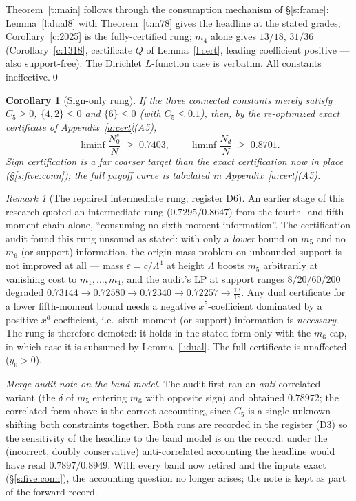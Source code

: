 \documentclass[11pt]{article}
\numberwithin{equation}{section}
\newtheorem{corollary}[theorem]{Corollary}
\theoremstyle{definition}
\theoremstyle{remark}
\newtheorem{remark}[theorem]{Remark}
\begin{document}
Theorem~\ref{t:main} follows through the consumption mechanism
of \S\ref{s:frame}: Lemma~\ref{l:dual8} with
Theorem~\ref{t:m78} gives the headline at the stated grades;
Corollary~\ref{c:2025} is the fully-certified rung; $m_4$
alone gives $13/18$, $31/36$
(Corollary~\ref{c:1318}, certificate $Q$ of Lemma~\ref{l:cert},
leading coefficient positive --- also support-free). The
Dirichlet $L$-function case is verbatim. All constants
ineffective.\qed

\begin{corollary}[Sign-only rung]\label{c:signs}
If the three connected constants merely satisfy $C_5\ge0$,
$\{4,2\}\le0$ and $\{6\}\le0$ (with $C_5\le0.1$), then, by the
re-optimized exact certificate of Appendix~\ref{a:cert}(A5),
\[
\liminf\frac{N_0^{s}}{N}\;\ge\;0.7403,\qquad
\liminf\frac{N_d}{N}\;\ge\;0.8701 .
\]
Sign certification is a far coarser target than the exact
certification now in place (\S\ref{s:five:conn}); the full
payoff curve is tabulated in Appendix~\ref{a:cert}(A5).
\end{corollary}

\begin{remark}[The repaired intermediate rung; register
D6]\label{r:rung}
An earlier stage of this research quoted an intermediate rung
($0.7295/0.8647$) from the fourth- and fifth-moment chain alone,
``consuming no sixth-moment information''. The certification
audit found this rung unsound as stated: with only a \emph{lower} bound on
$m_5$ and no $m_6$ (or support) information, the origin-mass
problem on unbounded support is not improved at all --- mass
$\varepsilon=c/\Lambda^{4}$ at height $\Lambda$ boosts $m_5$
arbitrarily at vanishing cost to $m_1,\dots,m_4$, and the audit's
LP at support ranges $8/20/60/200$ degraded
$0.73144\to0.72580\to0.72340\to0.72257\to\tfrac{13}{18}$. Any
dual certificate for a lower fifth-moment bound needs a negative
$x^5$-coefficient dominated by a positive $x^6$-coefficient, i.e.\
sixth-moment (or support) information is \emph{necessary}. The
rung is therefore demoted: it holds in the stated form only with
the $m_6$ cap, in which case it is subsumed by
Lemma~\ref{l:dual}. The full certificate is unaffected
($y_6>0$).
\end{remark}

\medskip
\noindent\emph{Merge-audit note on the band model.} The audit
first ran an \emph{anti}-correlated variant (the $\delta$ of
$m_5$ entering $m_6$ with opposite sign) and obtained $0.78972$;
the correlated form above is the correct accounting, since $C_5$
is a single unknown shifting both constraints together. Both runs
are recorded in the register (D3) so the sensitivity of the
headline to the band model is on the record: under the
(incorrect, doubly conservative) anti-correlated accounting the
headline would have read $0.7897/0.8949$. With every band now
retired and the inputs exact (\S\ref{s:five:conn}), the
accounting question no longer arises; the note is kept as part
of the forward record.
\end{document}
